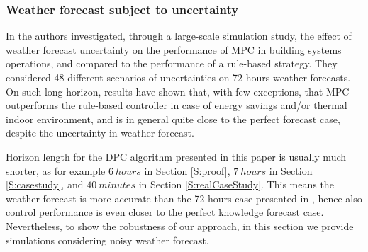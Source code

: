 \textcolor[rgb]{0,0,1}{
\subsubsection{Weather forecast subject to uncertainty}\label{SSS:DisturbanceUncertain}
In \cite{Petersen2014AE} the authors investigated, through a large-scale simulation study, the effect of weather forecast uncertainty on the performance of MPC in building systems operations, and compared to the performance of a rule-based strategy.
They considered 48 different scenarios of uncertainties on 72 hours weather forecasts.
On such long horizon, results have shown that, with few exceptions, that MPC outperforms the rule-based controller in case of energy savings and/or thermal indoor environment, and is in general quite close to the perfect forecast case, despite the uncertainty in weather forecast.}

\textcolor[rgb]{0,0,1}{Horizon length for the DPC algorithm presented in this paper is usually much shorter, as for example $6\ hours$ in Section \ref{S:proof}, $7\ hours$ in Section \ref{S:casestudy}, and $40\ minutes$ in Section \ref{S:realCaseStudy}. This means the weather forecast is more accurate than the 72 hours case presented in \cite{Petersen2014AE}, hence also control performance is even closer to the perfect knowledge forecast case.
Nevertheless, to show the robustness of our approach, in this section we provide simulations considering noisy weather forecast.}

